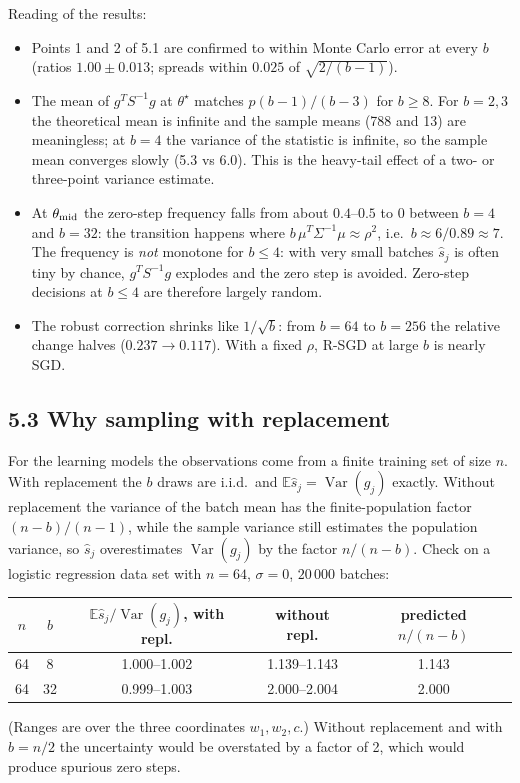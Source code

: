\documentclass[11pt,a4paper]{article}
\newcommand{\E}{\mathbb{E}}
\DeclareMathOperator{\Var}{Var}
\begin{document}
Reading of the results:
\begin{itemize}
\item Points 1 and 2 of 5.1 are confirmed to within Monte Carlo error at every $b$
(ratios $1.00\pm0.013$; spreads within $0.025$ of $\sqrt{2/(b-1)}$).
\item The mean of $g^TS^{-1}g$ at $\theta^\star$ matches $p(b-1)/(b-3)$ for $b\ge8$. For
$b=2,3$ the theoretical mean is infinite and the sample means (788 and 13) are
meaningless; at $b=4$ the variance of the statistic is infinite, so the sample mean
converges slowly (5.3 vs 6.0). This is the heavy-tail effect of a two- or
three-point variance estimate.
\item At $\theta_{\rm mid}$ the zero-step frequency falls from about $0.4$--$0.5$ to
$0$ between $b=4$ and $b=32$: the transition happens where
$b\,\mu^T\Sigma^{-1}\mu\approx\rho^2$, i.e.\ $b\approx6/0.89\approx7$. The frequency is
\emph{not} monotone for $b\le4$: with very small batches $\widehat s_j$ is often tiny by
chance, $g^TS^{-1}g$ explodes and the zero step is avoided. Zero-step decisions at
$b\le4$ are therefore largely random.
\item The robust correction shrinks like $1/\sqrt b$: from $b=64$ to $b=256$ the
relative change halves ($0.237\to0.117$). With a fixed $\rho$, R-SGD at large $b$ is
nearly SGD.
\end{itemize}

\subsection*{5.3 Why sampling with replacement}

For the learning models the observations come from a finite training set of size $n$.
With replacement the $b$ draws are i.i.d.\ and $\E\widehat s_j=\Var(g_j)$ exactly.
Without replacement the variance of the batch mean has the finite-population factor
$(n-b)/(n-1)$, while the sample variance still estimates the population variance, so
$\widehat s_j$ overestimates $\Var(g_j)$ by the factor $n/(n-b)$. Check on a logistic
regression data set with $n=64$, $\sigma=0$, $20\,000$ batches:

\begin{center}
\begin{tabular}{@{}ccccc@{}}
\toprule
$n$ & $b$ & $\E\widehat s_j/\Var(g_j)$, with repl. & without repl. & predicted $n/(n-b)$ \\
\midrule
64 & 8 & 1.000--1.002 & 1.139--1.143 & 1.143 \\
64 & 32 & 0.999--1.003 & 2.000--2.004 & 2.000 \\
\bottomrule
\end{tabular}
\end{center}
(Ranges are over the three coordinates $w_1,w_2,c$.) Without replacement and with
$b=n/2$ the uncertainty would be overstated by a factor of 2, which would produce
spurious zero steps.
\end{document}

